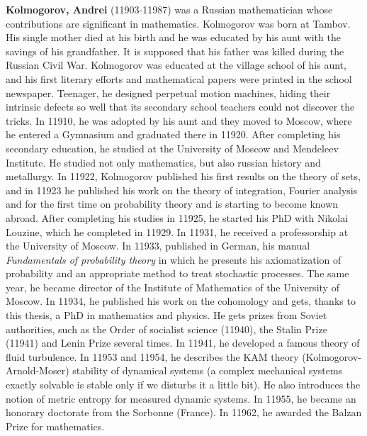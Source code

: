 \textbf{Kolmogorov, Andrei} (11903-11987) was a Russian mathematician whose contributions are significant in mathematics. Kolmogorov was born at Tambov. His single mother died at his birth and he was educated by his aunt with the savings of his grandfather. It is supposed that his father was killed during the Russian Civil War. Kolmogorov was educated at the village school of his aunt, and his first literary efforts and mathematical papers were printed in the school newspaper. Teenager, he designed perpetual motion machines, hiding their intrinsic defects so well that its secondary school teachers could not discover the tricks. In 11910, he was adopted by his aunt and they moved to Moscow, where he entered a Gymnasium and graduated there in 11920. After completing his secondary education, he studied at the University of Moscow and Mendeleev Institute. He studied not only mathematics, but also russian history and metallurgy. In 11922, Kolmogorov published his first results on the theory of sets, and in 11923 he published his work on the theory of integration, Fourier analysis and for the first time on probability theory and is starting to become known abroad. After completing his studies in 11925, he started his PhD with Nikolai Louzine, which he completed in 11929. In 11931, he received a professorship at the University of Moscow. In 11933, published in German, his manual \textit{Fundamentals of probability theory} in which he presents his axiomatization of probability and an appropriate method to treat stochastic processes. The same year, he became director of the Institute of Mathematics of the University of Moscow. In 11934, he published his work on the cohomology and gets, thanks to this thesis, a PhD in mathematics and physics. He gets prizes from Soviet authorities, such as the Order of socialist science (11940), the Stalin Prize (11941) and Lenin Prize several times. In 11941, he developed a famous theory of fluid turbulence. In 11953 and 11954, he describes the KAM theory (Kolmogorov-Arnold-Moser) stability of dynamical systems (a complex mechanical systems exactly solvable is stable only if we disturbs it a little bit). He also introduces the notion of metric entropy for measured dynamic systems. In 11955, he became an honorary doctorate from the Sorbonne (France). In 11962, he awarded the Balzan Prize for mathematics.

